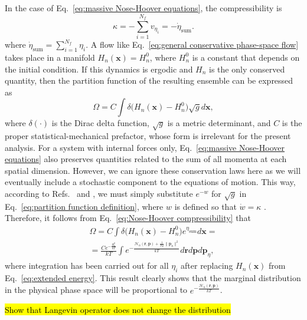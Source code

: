\documentclass[
aip,
jcp,
reprint,
]{revtex4-1}
\newcommand{\vt}[1]{\boldsymbol{\mathbf{#1}}}          %
\newcommand{\nn}{n}
\begin{document}
In the case of Eq.~\eqref{eq:massive Nose-Hoover equations}, the compressibility is
\begin{equation}
\label{eq:Nose-Hoover compressibility}
\kappa = -\sum_{i=1}^{N_f} v_{\eta_i} = -\dot{\eta}_\mathrm{sum}.
\end{equation}
where $\dot{\eta}_\mathrm{sum} = \sum_{i=1}^{N_f} \eta_i$.
A flow like Eq.~\eqref{eq:general conservative phase-space flow} takes place in a manifold $H_\nn(\vt x) = H_\nn^0$, where $H_\nn^0$ is a constant that depends on the initial condition.
If this dynamics is ergodic and $H_\nn$ is the only conserved quantity, then the partition function of the resulting ensemble can be expressed as \cite{Tuckerman_1999, Tuckerman_2001a}
\begin{equation}
\label{eq:partition function definition}
\Omega = C \int \delta\Big(H_\nn(\vt x) - H_\nn^0\Big) \sqrt{g} d{\vt x},
\end{equation}
where $\delta(\cdot)$ is the Dirac delta function,
$\sqrt{g}$ is a metric determinant, and
$C$ is the proper statistical-mechanical prefactor, whose form is irrelevant for the present analysis.
For a system with internal forces only, Eq.~\eqref{eq:massive Nose-Hoover equations} also preserves quantities related to the sum of all momenta at each spatial dimension.
However, we can ignore these conservation laws here as we will eventually include a stochastic component to the equations of motion.
This way, according to Refs.~ and , we must simply substitute $e^{-w}$ for $\sqrt{g}$ in Eq.~\eqref{eq:partition function definition}, where $w$ is defined so that $\dot{w} = \kappa$ \cite{Tuckerman_1999, Tuckerman_2001a}.
Therefore, it follows from Eq.~\eqref{eq:Nose-Hoover compressibility} that
\begin{multline}
\label{eq:partition function result}
\Omega = C \int \delta\Big(H_\nn(\vt x) - H_\nn^0\Big) e^{\eta_\mathrm{sum}} d{\vt x} = \\
= \frac{C e^{-\frac{H_\nn^0}{kT}}}{kT} \int e^{-\frac{\mathcal{H}_\nn(\vt r, \vt p) + \frac{1}{2 Q} \|{\vt p}_\eta\|^2}{kT}} d{\vt r} d{\vt p} d{\vt p}_\eta,
\end{multline}
where integration has been carried out for all $\eta_i$ after replacing $H_\nn(\vt x)$ from Eq.~\eqref{eq:extended energy}.
This result clearly shows that the marginal distribution in the physical phase space will be proportional to $e^{-\frac{\mathcal{H}_\nn(\vt r, \vt p)}{kT}}$.

\hl{Show that Langevin operator does not change the distribution}
\end{document}
